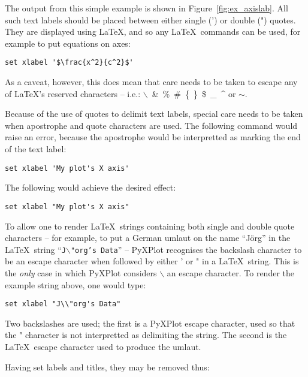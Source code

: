 \documentclass[a4paper,onecolumn,11pt]{book}
\begin{document}
\noindent The output from this simple example is shown in
Figure~\ref{fig:ex_axislab}. All such text labels should be placed between
either single (') or double (") quotes. They are displayed using \LaTeX, and so
any \LaTeX\ commands can be used, for example to put equations on axes:

\begin{verbatim}
set xlabel '$\frac{x^2}{c^2}$'
\end{verbatim}

\noindent As a caveat, however, this does mean that care needs to be taken to
escape any of \LaTeX's reserved characters -- i.e.:
$\backslash$~\&~\%~\#~\{~\}~\$~\_~\^{} or $\sim$.

Because of the use of quotes to delimit text labels, special care needs to be
taken when apostrophe and quote characters are used. The following command
would raise an error, because the apostrophe would be interpretted as marking
the end of the text label:

\begin{verbatim}
set xlabel 'My plot's X axis'
\end{verbatim}

\noindent The following would achieve the desired effect:

\begin{verbatim}
set xlabel "My plot's X axis"
\end{verbatim}

\noindent To allow one to render \LaTeX\ strings containing both single and
double quote characters -- for example, to put a German umlaut on the name
``J\"org'' in the \LaTeX\ string ``\texttt{J$\backslash$"org's Data}'' --
PyXPlot recognises the backslash character to be an escape character when
followed by either ' or " in a \LaTeX\ string. This is the \textit{only} case
in which PyXPlot considers $\backslash$ an escape character. To render the
example string above, one would type:

\begin{verbatim}
set xlabel "J\\"org's Data"
\end{verbatim}

Two backslashes are used; the first is a PyXPlot escape character, used so that
the " character is not interpretted as delimiting the string. The second is the
\LaTeX\ escape character used to produce the umlaut.  

Having set labels and titles, they may be removed thus:
\end{document}

